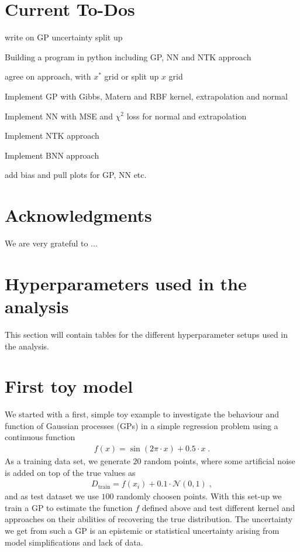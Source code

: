 \documentclass[11pt,a4paper]{article}
\begin{document}
\newpage
\section{Current To-Dos}
\begin{todolist}
    \item[\done] write on GP uncertainty split up
    \item[\done] Building a program in python including GP, NN and NTK approach
    \item[\done] agree on approach, with $x^*$ grid or split up $x$ grid
    \item[\done] Implement GP with Gibbs, Matern and RBF kernel, extrapolation and normal
    \item[\done] Implement NN with MSE and $\chi^2$ loss for normal and extrapolation
    \item[\done] Implement NTK approach
    \item Implement BNN approach
    \item add bias and pull plots for GP, NN etc.
    
\end{todolist}



\newpage
\section*{Acknowledgments}
We are very grateful to ...

\newpage

\appendix
\section{Hyperparameters used in the analysis}
This section will contain tables for the different hyperparameter setups used in the analysis.
\section{First toy model}
\label{app:toy}
%
We started with a first, simple toy example to investigate the behaviour and function of Gaussian processes (GPs) in a simple regression problem using a continuous function
%
\begin{align}
    f(x) = \sin(2\pi \cdot x) + 0.5 \cdot x \; .
\end{align} 
%
As a training data set, we generate $20$ random points, where some artificial noise is added on top of the true values as
%
\begin{align}
    D_\text{train} = f(x_i) + 0.1 \cdot \mathcal{N}(0, 1) \; ,
\end{align}
%
and as test dataset we use $100$ randomly choosen points. 
With this set-up we train a GP to estimate the function $f$ defined above and test different kernel and approaches on their abilities of recovering the true distribution. The uncertainty we get from such a GP is an epistemic or statistical uncertainty arising from model simplifications and lack of data.
\end{document}
